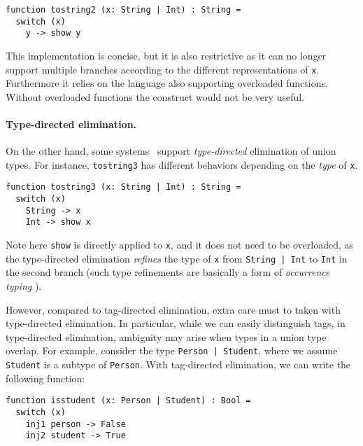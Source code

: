 \begin{lstlisting}
function tostring2 (x: String | Int) : String =
  switch (x)
    y -> show y
\end{lstlisting}

This implementation is concise, but it is also restrictive as it can no longer
support multiple branches according to the different representations of
\lstinline{x}. Furthermore it relies on the language also supporting overloaded
functions. Without overloaded functions the construct would not be very useful.

\paragraph{Type-directed elimination.}

On the other hand, some
systems~\cite{castagna:settheoretic,muehlboeck2018empowering} support
\textit{type-directed} elimination of union types. For instance,
\lstinline{tostring3} has different behaviors depending on the \textit{type} of
\lstinline{x}.

\begin{lstlisting}
function tostring3 (x: String | Int) : String =
  switch (x)
    String -> x
    Int -> show x
\end{lstlisting}

\noindent Note here \lstinline{show} is directly applied to \lstinline{x}, and
it does not need to be overloaded, as the type-directed elimination
\textit{refines} the type of \lstinline{x} from \lstinline{String | Int} to
\lstinline{Int} in the second branch (such type refinements are basically a form of
\textit{occurrence typing} \cite{Tobin:typedscheme}).

However, compared to tag-directed elimination, extra care must to taken with
type-directed elimination. In particular, while we can easily distinguish tags,
in type-directed elimination, ambiguity may arise when types in a union type
overlap. For example, consider the type \lstinline{Person | Student}, where we
assume \lstinline{Student} is a subtype of \lstinline{Person}. With tag-directed
elimination, we can write the following function:

\begin{lstlisting}
function isstudent (x: Person | Student) : Bool =
  switch (x)
    inj1 person -> False
    inj2 student -> True
\end{lstlisting}

